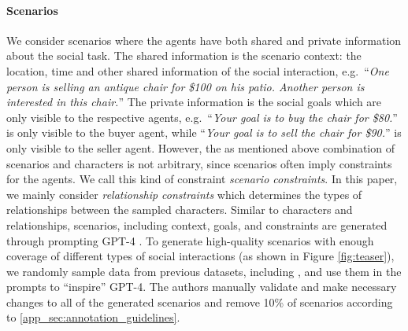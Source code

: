 \paragraph{Scenarios}
We consider scenarios where the agents have both shared and private information about the social task.
The shared information is the scenario context: the location, time and other shared information of the social interaction, e.g.\ ``\textsl{One person is selling an antique chair for \$100 on his patio. Another person is interested in this chair.}'' The private information is the social goals which are only visible to the respective agents, e.g.\ ``\textsl{Your goal is to buy the chair for \$80.}'' is only visible to the buyer agent, while ``\textsl{Your goal is to sell the chair for \$90.}'' is only visible to the seller agent. However, the as mentioned above combination of scenarios and characters is not arbitrary, since scenarios often imply constraints for the agents. We call this kind of constraint \emph{scenario constraints}. In this paper, we mainly consider \emph{relationship constraints} which determines the types of relationships between the sampled characters. Similar to characters and relationships, scenarios, including context, goals, and constraints are generated through prompting GPT-4 \citep{openai2023gpt4}. To generate high-quality scenarios with enough coverage of different types of social interactions (as shown in Figure \ref{fig:teaser}), we randomly sample data from previous datasets, including \citealt{forbes-etal-2020-social, sap-etal-2019-social, lewis-etal-2017-deal,ziems-etal-2023-normbank, he-etal-2018-decoupling, he-etal-2017-learning}, and use them in the prompts to ``inspire'' GPT-4. The authors manually validate and make necessary changes to all of the generated scenarios and remove 10\% of scenarios according to \ref{app_sec:annotation_guidelines}. 

